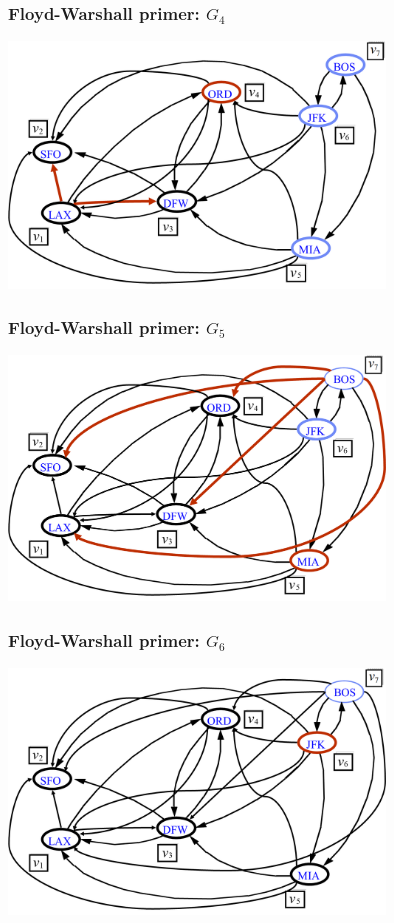 \documentclass[compress,aspectratio=169]{beamer}
\begin{document}
\begin{frame}[fragile]
  \frametitle{Floyd-Warshall primer: $G_4$}
  \begin{center}
    \includegraphics[width=10cm]{asp-14-pic41.png}
  \end{center}
\end{frame}

\begin{frame}[fragile]
  \frametitle{Floyd-Warshall primer: $G_5$}
  \begin{center}
    \includegraphics[width=10cm]{asp-14-pic42.png}
  \end{center}
\end{frame}

\begin{frame}[fragile]
  \frametitle{Floyd-Warshall primer: $G_6$}
  \begin{center}
    \includegraphics[width=10cm]{asp-14-pic43.png}
  \end{center}
\end{frame}
\end{document}
